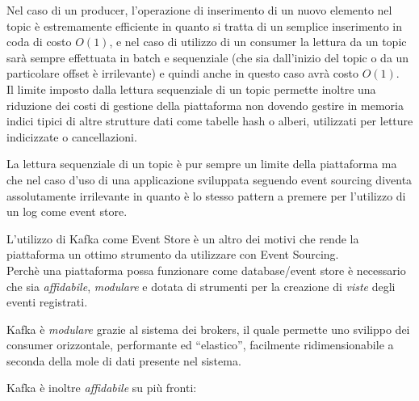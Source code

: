 \documentclass[]{article}
\begin{document}
Nel caso di un producer, l'operazione di inserimento di un nuovo
elemento nel topic è estremamente efficiente in quanto si tratta di un
semplice inserimento in coda di costo \(O(1)\), e nel caso di utilizzo
di un consumer la lettura da un topic sarà sempre effettuata in batch e
sequenziale (che sia dall'inizio del topic o da un particolare offset è
irrilevante) e quindi anche in questo caso avrà costo \(O(1)\).\\
Il limite imposto dalla lettura sequenziale di un topic permette inoltre
una riduzione dei costi di gestione della piattaforma non dovendo
gestire in memoria indici tipici di altre strutture dati come tabelle
hash o alberi, utilizzati per letture indicizzate o cancellazioni.

La lettura sequenziale di un topic è pur sempre un limite della
piattaforma ma che nel caso d'uso di una applicazione sviluppata
seguendo event sourcing diventa assolutamente irrilevante in quanto è lo
stesso pattern a premere per l'utilizzo di un log come event store.

L'utilizzo di Kafka come Event Store è un altro dei motivi che rende la
piattaforma un ottimo strumento da utilizzare con Event Sourcing.\\
Perchè una piattaforma possa funzionare come database/event store è
necessario che sia \emph{affidabile}, \emph{modulare} e dotata di
strumenti per la creazione di \emph{viste} degli eventi registrati.

Kafka è \emph{modulare} grazie al sistema dei brokers, il quale permette
uno svilippo dei consumer orizzontale, performante ed ``elastico'',
facilmente ridimensionabile a seconda della mole di dati presente nel
sistema.

Kafka è inoltre \emph{affidabile} su più fronti:
\end{document}
